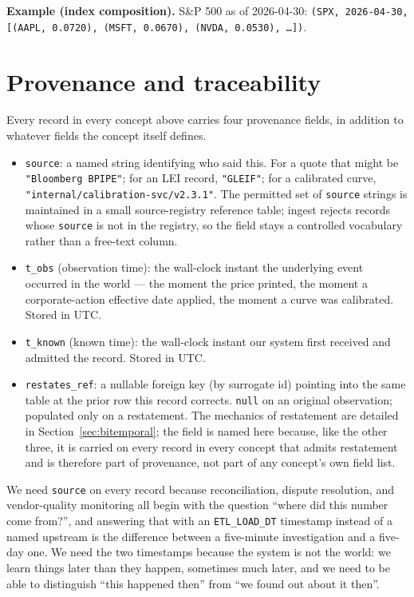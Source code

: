\documentclass[11pt,a4paper]{article}
\begin{document}
\textbf{Example (index composition).} S\&P 500 as of 2026-04-30: \texttt{(SPX, 2026-04-30, [(AAPL, 0.0720), (MSFT, 0.0670), (NVDA, 0.0530), \ldots])}.

\section{Provenance and traceability}\label{sec:provenance}

Every record in every concept above carries four provenance fields, in addition to whatever fields the concept itself defines.

\begin{itemize}
\item \texttt{source}: a named string identifying who said this. For a quote that might be \texttt{"Bloomberg BPIPE"}; for an LEI record, \texttt{"GLEIF"}; for a calibrated curve, \texttt{"internal/calibration-svc/v2.3.1"}. The permitted set of \texttt{source} strings is maintained in a small source-registry reference table; ingest rejects records whose \texttt{source} is not in the registry, so the field stays a controlled vocabulary rather than a free-text column.
\item \texttt{t\_obs} (observation time): the wall-clock instant the underlying event occurred in the world --- the moment the price printed, the moment a corporate-action effective date applied, the moment a curve was calibrated. Stored in UTC.
\item \texttt{t\_known} (known time): the wall-clock instant our system first received and admitted the record. Stored in UTC.
\item \texttt{restates\_ref}: a nullable foreign key (by surrogate id) pointing into the same table at the prior row this record corrects. \texttt{null} on an original observation; populated only on a restatement. The mechanics of restatement are detailed in Section~\ref{sec:bitemporal}; the field is named here because, like the other three, it is carried on every record in every concept that admits restatement and is therefore part of provenance, not part of any concept's own field list.
\end{itemize}

We need \texttt{source} on every record because reconciliation, dispute resolution, and vendor-quality monitoring all begin with the question ``where did this number come from?'', and answering that with an \texttt{ETL\_LOAD\_DT} timestamp instead of a named upstream is the difference between a five-minute investigation and a five-day one. We need the two timestamps because the system is not the world: we learn things later than they happen, sometimes much later, and we need to be able to distinguish ``this happened then'' from ``we found out about it then''.
\end{document}
